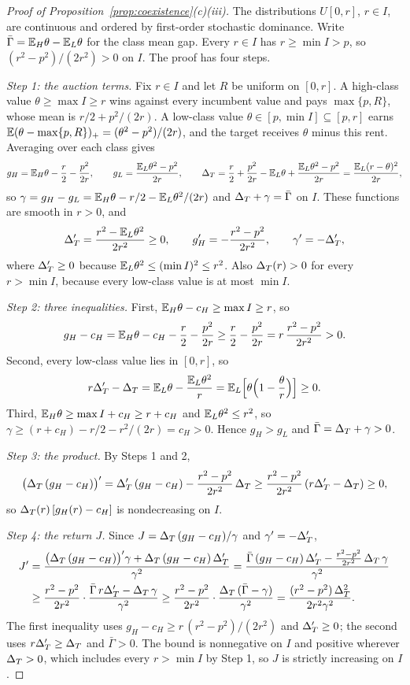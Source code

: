 \begin{proof}[Proof of Proposition~\ref{prop:coexistence}(c)(iii)]
The distributions \(U[0,r]\), \(r\in I\), are continuous and ordered by first-order stochastic dominance. Write
\(\bar\Gamma=\mathbb{E}_H\theta-\mathbb{E}_L\theta\) for the class mean gap. Every \(r\in I\) has \(r\ge\min I>p\), so
\((r^2-p^2)/(2r^2)>0\) on \(I\). The proof has four steps.

\emph{Step 1: the auction terms.} Fix \(r\in I\) and let \(R\) be uniform on \([0,r]\). A high-class value
\(\theta\ge\max I\ge r\) wins against every incumbent value and pays \(\max\{p,R\}\), whose mean is
\(r/2+p^2/(2r)\). A low-class value \(\theta\in[p,\min I]\subseteq[p,r]\) earns
\(\mathbb{E}(\theta-\max\{p,R\})_+=(\theta^2-p^2)/(2r)\), and the target receives \(\theta\) minus this rent. Averaging over
each class gives
\[
g_H=\mathbb{E}_H\theta-\frac r2-\frac{p^2}{2r},\qquad g_L=\frac{\mathbb{E}_L\theta^2-p^2}{2r},\qquad
\Delta_T=\frac r2+\frac{p^2}{2r}-\mathbb{E}_L\theta+\frac{\mathbb{E}_L\theta^2-p^2}{2r}=\frac{\mathbb{E}_L(r-\theta)^2}{2r},
\]
so \(\gamma=g_H-g_L=\mathbb{E}_H\theta-r/2-\mathbb{E}_L\theta^2/(2r)\) and \(\Delta_T+\gamma=\bar\Gamma\) on \(I\). These functions are smooth
in \(r>0\), and
\[
\Delta_T'=\frac{r^2-\mathbb{E}_L\theta^2}{2r^2}\ge0,\qquad g_H'=-\frac{r^2-p^2}{2r^2},\qquad \gamma'=-\Delta_T',
\]
where \(\Delta_T'\ge0\) because \(\mathbb{E}_L\theta^2\le(\min I)^2\le r^2\). Also \(\Delta_T(r)>0\) for every \(r>\min I\), because every
low-class value is at most \(\min I\).

\emph{Step 2: three inequalities.} First, \(\mathbb{E}_H\theta-c_H\ge\max I\ge r\), so
\[
g_H-c_H=\mathbb{E}_H\theta-c_H-\frac r2-\frac{p^2}{2r}\ge\frac r2-\frac{p^2}{2r}=r\,\frac{r^2-p^2}{2r^2}>0 .
\]
Second, every low-class value lies in \([0,r]\), so
\[
r\Delta_T'-\Delta_T=\mathbb{E}_L\theta-\frac{\mathbb{E}_L\theta^2}{r}=\mathbb{E}_L\Bigl[\theta\Bigl(1-\frac\theta r\Bigr)\Bigr]\ge0 .
\]
Third, \(\mathbb{E}_H\theta\ge\max I+c_H\ge r+c_H\) and \(\mathbb{E}_L\theta^2\le r^2\), so \(\gamma\ge(r+c_H)-r/2-r^2/(2r)=c_H>0\).
Hence \(g_H>g_L\) and \(\bar\Gamma=\Delta_T+\gamma>0\).

\emph{Step 3: the product.} By Steps 1 and 2,
\[
\bigl(\Delta_T\,(g_H-c_H)\bigr)'=\Delta_T'\,(g_H-c_H)-\frac{r^2-p^2}{2r^2}\,\Delta_T\ge\frac{r^2-p^2}{2r^2}\,(r\Delta_T'-\Delta_T)\ge0 ,
\]
so \(\Delta_T(r)\,[g_H(r)-c_H]\) is nondecreasing on \(I\).

\emph{Step 4: the return \(J\).} Since \(J=\Delta_T\,(g_H-c_H)/\gamma\) and \(\gamma'=-\Delta_T'\),
\begin{align*}
J'&=\frac{\bigl(\Delta_T\,(g_H-c_H)\bigr)'\gamma+\Delta_T\,(g_H-c_H)\,\Delta_T'}{\gamma^2}
=\frac{\bar\Gamma\,(g_H-c_H)\,\Delta_T'-\frac{r^2-p^2}{2r^2}\,\Delta_T\,\gamma}{\gamma^2}\\
&\ge\frac{r^2-p^2}{2r^2}\cdot\frac{\bar\Gamma\,r\Delta_T'-\Delta_T\,\gamma}{\gamma^2}
\ge\frac{r^2-p^2}{2r^2}\cdot\frac{\Delta_T\,(\bar\Gamma-\gamma)}{\gamma^2}=\frac{(r^2-p^2)\,\Delta_T^2}{2r^2\gamma^2}.
\end{align*}
The first inequality uses \(g_H-c_H\ge r\,(r^2-p^2)/(2r^2)\) and \(\Delta_T'\ge0\); the second uses \(r\Delta_T'\ge\Delta_T\) and
\(\bar\Gamma>0\). The bound is nonnegative on \(I\) and positive wherever \(\Delta_T>0\), which includes every \(r>\min I\) by
Step 1, so \(J\) is strictly increasing on \(I\).
\end{proof}

